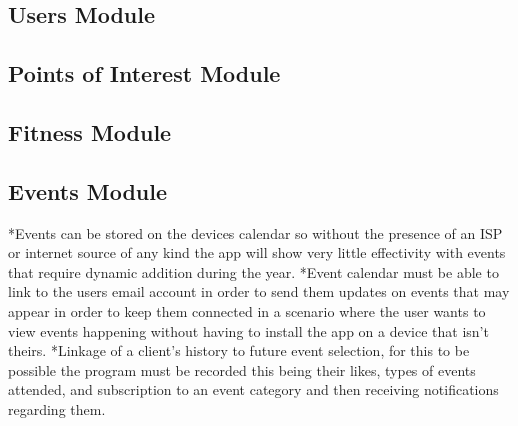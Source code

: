\documentclass[11pt]{article}
\begin{document}
  \subsection{Users Module}
  
  \subsection{Points of Interest Module}
  
  \subsection{Fitness Module}

  \subsection{Events Module}
  *Events can be stored on the devices calendar so without the presence of an ISP or internet source
  of any kind the app will show very little effectivity with events that require dynamic addition during
  the year.
  *Event calendar must be able to link to the users email account in order to send them updates on events
  that may appear in order to keep them connected in a scenario where the user wants to view events happening 
  without having to install the app on a device that isn’t theirs.
  *Linkage of a client’s history to future event selection, for this to be possible the program must be 
  recorded this being their likes, types of events attended, and subscription to an event category and 
  then receiving notifications regarding them.

  
  
 
\end{document}
